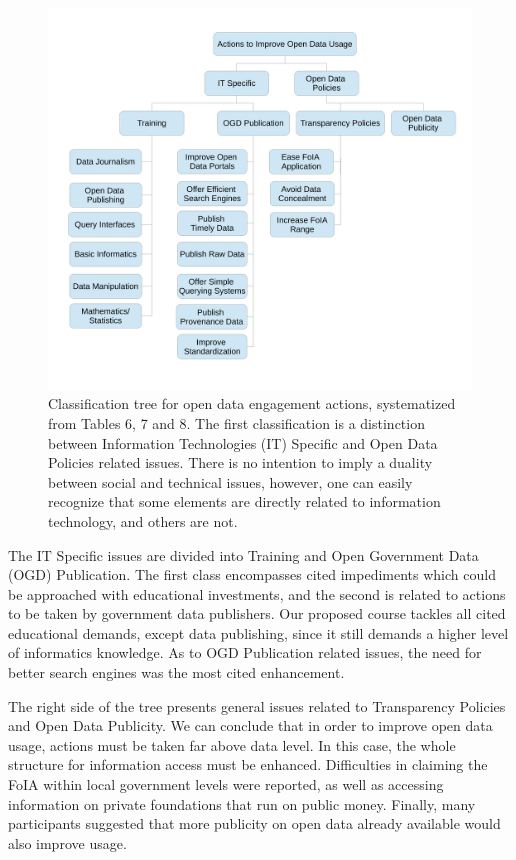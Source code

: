 \begin{figure}[h!]
\begin{center}
\includegraphics[scale=0.5]{images/impediments_classification.pdf}
\caption[Classification tree for open data engagement actions.]{Classification tree for open data engagement actions, systematized from Tables 6, 7 and 8.
The first classification is a distinction between Information Technologies (IT) Specific and Open Data Policies related issues. There is no intention to imply a duality between social and technical issues, however, one can easily recognize that some elements are directly related to information technology, and others are not.
}
\label{fig:dl_results}
\end{center}
\end{figure}


The IT Specific issues are divided into Training and Open Government Data (OGD) Publication. The first class encompasses cited impediments which could be approached with educational investments, and the second is related to actions to be taken by government data publishers. Our proposed course tackles all cited educational demands, except data publishing, since it still demands a higher level of informatics knowledge.  As to OGD Publication related issues, the need for better search engines was the most cited enhancement.

The right side of the tree presents general issues related to Transparency Policies and Open Data Publicity. We can conclude that in order to improve open data usage, actions must be taken far above data level. In this case, the whole structure for information access must be enhanced. Difficulties in claiming the FoIA within local government levels were reported, as well as accessing information on private foundations that run on public money. Finally, many participants suggested that more publicity on open data already available would also improve usage.

